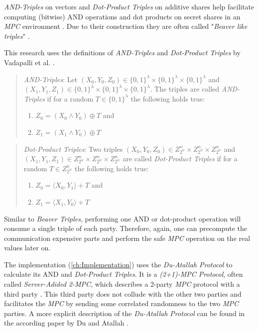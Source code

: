\label{sub:MultiplicationAdditionTriples}
\textit{AND-Triples} on vectors and \textit{Dot-Product Triples} on additive shares help facilitate computing (bitwise) AND operations and dot products on secret shares in an \textit{MPC} environment \cite{kyle2023grotto}.
Due to their construction they are often called "\textit{Beaver like triples}" \cite{kyle2023grotto}.

This research uses the definitions of \textit{AND-Triples} and \textit{Dot-Product Triples} by Vadapalli et al. \cite{vadapalli2023duoram}.
\begin{quote}
    \textit{AND-Triples}:
    Let $(X_0,Y_0,Z_0)\in \{0,1\}^\lambda\times\{0,1\}^\lambda\times\{0,1\}^\lambda$ and $(X_1,Y_1,Z_1)\in \{0,1\}^\lambda\times\{0,1\}^\lambda\times\{0,1\}^\lambda$.
    The triples are called \textit{AND-Triples} if for a random $T\in\{0,1\}^\lambda$ the following holds true:
    \begin{enumerate}
        \item $Z_0=(X_0\land Y_0)\oplus T$ and
        \item $Z_1 = (X_1\land Y_0)\oplus T$
    \end{enumerate}
\end{quote}

\begin{quote}
    \textit{Dot-Product Triples}:
    Two triples $(X_0,Y_0,Z_0)\in Z^n_{2^w}\times Z^n_{2^w}\times Z^n_{2^w}$ and $(X_1,Y_1,Z_1)\in Z^n_{2^w}\times Z^n_{2^w}\times Z^n_{2^w}$ are called \textit{Dot-Product Triples} if for a random $T\in Z^n_{2^w}$ the following holds true:
    \begin{enumerate}
        \item $Z_0=\langle X_0,Y_1\rangle+T$ and
        \item $Z_1=\langle X_1,Y_0\rangle+T$
    \end{enumerate}
\end{quote}

Similar to \textit{Beaver Triples}, performing one AND or dot-product operation will consume a single triple of each party.
Therefore, again, one can precompute the communication expensive parts and perform the safe \textit{MPC} operation on the real values later on.

The implementation (\ref{ch:Implementation}) uses the \textit{Du-Atallah Protocol} \cite{ata01priv} to calculate its AND and \textit{Dot-Product Triples}.
It is a \textit{(2+1)-MPC Protocol}, often called \textit{Server-Adided 2-MPC}, which describes a 2-party \textit{MPC} protocol with a third party \cite{vadapalli2023duoram}.
This third party does not collude with the other two parties and facilitates the \textit{MPC} by sending some correlated randomness to the two \textit{MPC} parties.
A more explicit description of the \textit{Du-Atallah Protocol} can be found in the according paper by Du and Atallah \cite{ata01priv}.